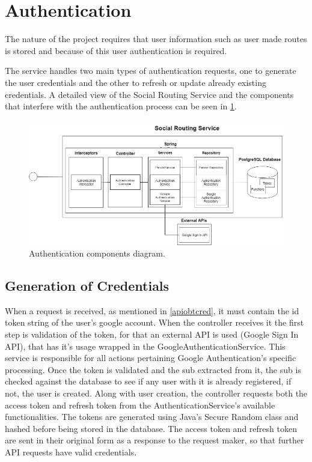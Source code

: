     \section{Authentication}

    The nature of the project requires that user information such as user made routes is stored and
    because of this user authentication is required.  

    The service handles two main types of authentication requests, one to generate the user credentials and the other to refresh or update
    already existing credentials. A detailed view of the Social Routing Service and the components that interfere with the authentication process can be seen 
    in \ref{fig:serviceauth}.
    
    \begin{figure}[ht]            
        \includegraphics[width=\textwidth]{images/project-structure/service-auth.PNG} 
        \caption{Authentication components diagram.}
        \label{fig:serviceauth}
    \end{figure}   

    \subsection{Generation of Credentials}
    When a request is received, as mentioned in \ref{apiobtcred}, it must contain the id token string of the user's google account. 
    When the controller receives it the first step is validation of the token, for that an external API is used (Google Sign In API), that has it's usage wrapped 
    in the GoogleAuthenticationService\cite{googleauthservicecode}. This service is responsible for all actions pertaining Google Authentication's specific processing.
    Once the token is validated and the sub extracted from it, the sub is checked against the database to see if any user with it is already registered, if not,
    the user is created. Along with user creation, the controller requests both the access token and refresh token from the AuthenticationService's\cite{authservicecode}
    available functionalities. The tokens are generated using Java's Secure Random class\cite{securerandom} and hashed before being stored in the database. 
    The access token and refresh token are sent in their original form as a response to the request maker, so that further API requests have valid credentials.

